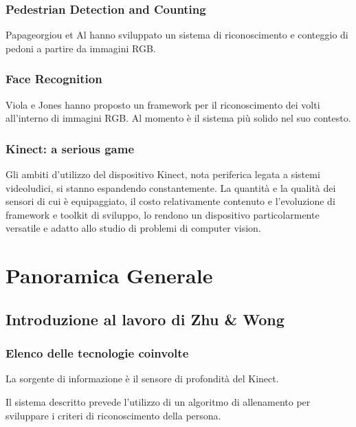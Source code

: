             \subsubsection{Pedestrian Detection and Counting}
            Papageorgiou et Al \cite{Papageorgiou98} hanno sviluppato un sistema di riconoscimento e conteggio di pedoni a partire da immagini RGB.

            \subsubsection{Face Recognition}
            Viola e Jones \cite{Viola04} hanno proposto un framework per il riconoscimento dei volti all'interno di immagini RGB. Al momento è il sistema più solido nel suo contesto.

            \subsubsection{Kinect: a serious game}
            Gli ambiti d'utilizzo del dispositivo Kinect, nota periferica legata a sistemi videoludici, si stanno espandendo constantemente. La quantità e la qualità dei sensori di cui è equipaggiato, il costo relativamente contenuto e l'evoluzione di framework e toolkit di sviluppo, lo rendono un dispositivo particolarmente versatile e adatto allo studio di problemi di computer vision.

    \section{Panoramica Generale}
    \label{sec:overview}
        \subsection{Introduzione al lavoro di Zhu & Wong}
            \subsubsection{Elenco delle tecnologie coinvolte}
                La sorgente di informazione è il sensore di profondità del Kinect.

                Il sistema descritto prevede l'utilizzo di un algoritmo di allenamento per sviluppare i criteri di riconoscimento della persona.

